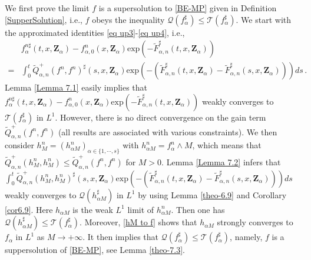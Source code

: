 \documentclass[reqno,11pt]{amsart}
\numberwithin{equation}{section}
\def\exp{\mathrm{exp}}
\begin{document}
We first prove the limit $f$ is a supersolution to \eqref{BE-MP} given in Definition \ref{SupperSolution}, i.e., $f$ obeys the inequality $ \mathcal{Q} (f_\alpha^\sharp) \leq \mathcal{T} (f_\alpha^\sharp) $. We start with the approximated identities \eqref{eq up3}-\eqref{eq up4}, i.e.,
\begin{equation*}
  \begin{aligned}
    &f^{n\sharp}_\alpha (t,x,\mathbf{Z}_\alpha) -f^n_{\alpha ,0} (x,\mathbf{Z}_\alpha )\exp(-\tilde{F}^\sharp _{\alpha ,n } (t,x,\mathbf{Z}_\alpha))\\
		=&\int_{0}^{t}\tilde{Q}^+_{\alpha ,n} (f^n,f^n)^\sharp (s ,x,\mathbf{Z}_\alpha) \exp(-(\tilde{F}^\sharp _{\alpha ,n} (t,x,\mathbf{Z}_\alpha )-\tilde{F}^\sharp _{\alpha ,n} (s,x,\mathbf{Z}_\alpha))) ds \,.
  \end{aligned}
\end{equation*}
Lemma \ref{Lemma 7.1} easily implies that $f^{n\sharp}_\alpha (t,x,\mathbf{Z}_\alpha) -f^n_{\alpha ,0} (x,\mathbf{Z}_\alpha )\exp(-\tilde{F}^\sharp _{\alpha ,n } (t,x,\mathbf{Z}_\alpha))$ weakly converges to $\mathcal{T} (f_\alpha^\sharp)$ in $L^1$. However, there is no direct convergence on the gain term $\tilde{Q}^+_{\alpha ,n} (f^n,f^n)$ (all results are associated with various constraints). We then consider $h^n_M = ( h^n_{\alpha M} )_{ \alpha \in \{ 1, \cdots, s \} }$ with $h^n_{\alpha M} = f^n_\alpha \wedge M$, which means that $ \tilde{Q}^+_{\alpha ,n} (h^n_M,h^n_M) \leq \tilde{Q}^+_{\alpha ,n} (f^n,f^n) $ for $M > 0$. Lemma \ref{Lemma 7.2} infers that $ \int_{0}^{t}\tilde{Q}^+_{\alpha ,n} (h^n_M,h^n_M)^\sharp (s ,x,\mathbf{Z}_\alpha) \exp(-(\tilde{F}^\sharp _{\alpha ,n} (t,x,\mathbf{Z}_\alpha )-\tilde{F}^\sharp _{\alpha ,n} (s,x,\mathbf{Z}_\alpha))) ds $ weakly converges to $ \mathcal{Q} (h_{\alpha M}^\sharp) $ in $L^1$ by using Lemma \ref{theo-6.9} and Corollary \ref{cor6.9}. Here $h_{ \alpha M }$ is the weak $L^1$ limit of $h^n_{\alpha M}$. Then one has $\mathcal{Q} (h_{\alpha M}^\sharp) \leq \mathcal{T} (f_{\alpha}^\sharp)$. Moreover, \eqref{hM to f} shows that $h_{\alpha M}$ strongly converges to $f_\alpha$ in $L^1$ as $M \to + \infty$. It then implies that $ \mathcal{Q} (f_\alpha^\sharp) \leq \mathcal{T} (f_\alpha^\sharp) $, namely, $f$ is a suppersolution of \eqref{BE-MP}, see Lemma \ref{theo-7.3}.
\end{document}
